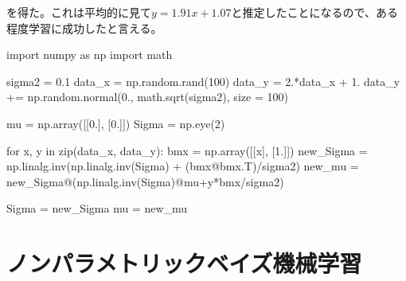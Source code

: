 \documentclass[dvipdfmx, 9pt, a4paper]{jsarticle}
\begin{document}
を得た。これは平均的に見て$y=1.91x+1.07$と推定したことになるので、ある程度学習に成功したと言える。\bigskip
\begin{python}
import numpy as np
import math

sigma2 = 0.1
data_x = np.random.rand(100)
data_y = 2.*data_x + 1. 
data_y += np.random.normal(0., math.sqrt(sigma2), size = 100)

mu = np.array([[0.], [0.]])
Sigma = np.eye(2)

for x, y in zip(data_x, data_y):
	bmx = np.array([[x], [1.]])
	new_Sigma = np.linalg.inv(np.linalg.inv(Sigma) + (bmx@bmx.T)/sigma2)
	new_mu = new_Sigma@(np.linalg.inv(Sigma)@mu+y*bmx/sigma2)

	Sigma = new_Sigma
	mu = new_mu
\end{python}

\section{ノンパラメトリックベイズ機械学習}
\end{document}
